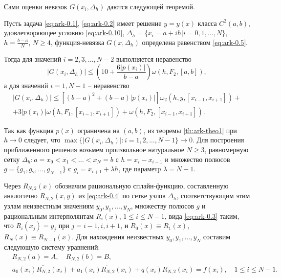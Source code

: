 Сами оценки невязок $G(x_i, \Delta_h)$ даются следующей теоремой.

\begin{theorem}\label{th:ark-theo1}
Пусть задача \eqref{eq:ark-0.1}, \eqref{eq:ark-0.2} имеет решение $y=y(x)$ класса $C^2(a,b)$, удовлетворяющее
условию \eqref{eq:ark-0.10}, $\Delta_h=\{x_i=a+ih |i=0,1,\dots,N\}$, $h=\frac{b-a}N$,
$N\geqslant 4$, функция-невязка $G(x, \Delta_h)$ определена равенством \eqref{eq:ark-0.5}.

Тогда для значений $i=2,3,\dots,N-2$ выполняется неравенство
\begin{equation*}\label{eq:ark-0.12}
|G(x_i,\Delta_h)|\leqslant
\left(10+\frac{6|p(x_i)|}{b-a}\right)\omega(h, F_2, [a,b]),
\end{equation*}
а для значений $i=1,N-1$  -- неравенство
\begin{multline*}\label{eq:ark-0.13}
|G(x_i,\Delta_h)|\leqslant [(b-a)^2+(b-a)|p(x_i)|]\omega_2(h, y, [x_{i-1}, x_{i+1}])+
\\
+3|p(x_i)|\omega(h, F_1,[x_{i-1}, x_{i+1}])+
\omega(h, F_2, [x_{i-1}, x_{i+1}]).
\end{multline*}
\end{theorem}

Так как функция $p(x)$ ограничена на $(a,b)$, из теоремы \ref{th:ark-theo1} при $h\to 0$
следует, что
$\max\{|G(x_i, \Delta_h)|: i=1,2,\dots,N-1\}\to 0$.
Для построения приближенного решения возьмем произвольное натуральное $N\geqslant 3$,
равномерную сетку
$\Delta_h: a=x_0<x_1<\dots<x_N=b$ с $h=x_i-x_{i-1}$ и множество полюсов
$g=\{g_1,g_2,\dots,g_{N-1}\}$ с $g_i=x_{i+1}+\lambda h$, где параметр $\lambda=N-1$.

Через $R_{N,2}(x)$ обозначим рациональную сплайн-функцию, составленную
аналогично $R_{N,2}(x,y)$ из \eqref{eq:ark-0.4} по сетке узлов $\Delta_h$, соответствующим этим узлам
неизвестным
значениям $y_0,y_1,\dots,y_N$, множеству полюсов $g$ и рациональным интерполянтам
$R_i(x)$, $1\leqslant i\leqslant N-1$, вида \eqref{eq:ark-0.3} таким, что $R_i(x_j)=y_j$ при
$j=i-1,i,i+1$, и $R_0(x)\equiv R_1(x)$, $R_N(x)\equiv R_{N-1}(x)$.
Для нахождения неизвестных $y_0,y_1,\dots,y_N$ составим следующую систему уравнений:
\begin{equation}\label{eq:ark-2.1}
\begin{split}
&R_{N,2}(a)=A, \quad R_{N,2}(b)=B,\\
&a_0(x_i)R^{\prime\prime}_{N,2}(x_i)+a_1(x_i)R^\prime_{N,2}(x_i)+q(x_i)R_{N,2}(x_i)=f(x_i),
\quad 1\leqslant i\leqslant N-1.
\end{split}
\end{equation}

